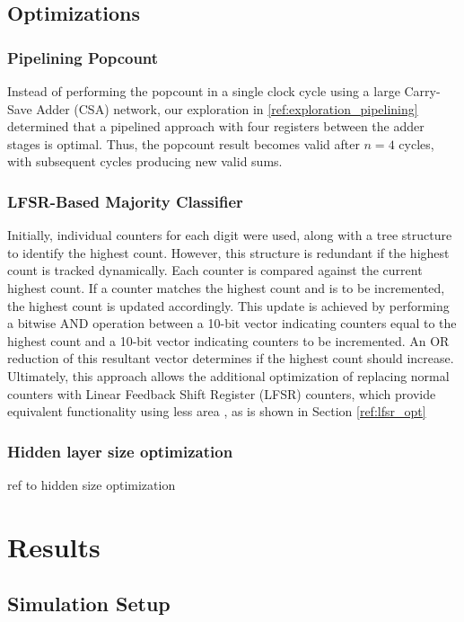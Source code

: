 \documentclass[conference]{IEEEtran}
\begin{document}
\subsection{Optimizations}
\subsubsection{Pipelining Popcount}
\label{ref:pipeline_popcount}

Instead of performing the popcount in a single clock cycle using a large Carry-Save Adder (CSA) network, our exploration in \autoref{ref:exploration_pipelining} determined that a pipelined approach with four registers between the adder stages is optimal. Thus, the popcount result becomes valid after $n=4$ cycles, with subsequent cycles producing new valid sums.

\subsubsection{LFSR-Based Majority Classifier}

Initially, individual counters for each digit were used, along with a tree structure to identify the highest count. However, this structure is redundant if the highest count is tracked dynamically. Each counter is compared against the current highest count. If a counter matches the highest count and is to be incremented, the highest count is updated accordingly. This update is achieved by performing a bitwise AND operation between a 10-bit vector indicating counters equal to the highest count and a 10-bit vector indicating counters to be incremented. An OR reduction of this resultant vector determines if the highest count should increase. 
Ultimately, this approach allows the additional optimization of replacing normal counters with Linear Feedback Shift Register (LFSR) counters, which provide equivalent functionality using less area \cite{xilinx_lfsr}, as is shown in Section \ref{ref:lfsr_opt}

\subsubsection{Hidden layer size optimization}
ref to hidden size optimization 


\section{Results}
\label{sec:results}
\subsection{Simulation Setup}
\end{document}
